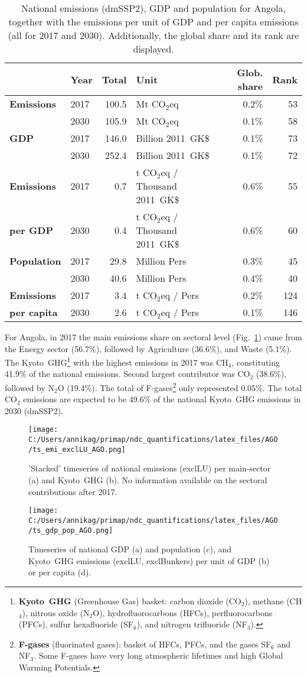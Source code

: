 \documentclass[12pt]{article}
\begin{document}
 \begin{table}[htbp]
 \centering
 \caption{National emissions (dmSSP2), GDP and population for Angola, together with the emissions per unit of GDP and per capita emissions (all for 2017 and 2030). 
 Additionally, the global share and its rank are displayed.}
 \label{tab:overview}
 \begin{tabular}{l || l r l r r}
 \bfseries  & \bfseries Year & \bfseries Total & \bfseries Unit & \bfseries Glob. share & \bfseries Rank \tabularnewline \hline \hline
 \bfseries Emissions & 2017 & 100.5 & Mt CO$_2$eq & 0.2\% & 53 \tabularnewline 
 \bfseries  & 2030 & 105.9 & Mt CO$_2$eq & 0.1\% & 58 \tabularnewline \hline
 \bfseries GDP & 2017 & 146.0 & Billion 2011~GK\$ & 0.1\% & 73 \tabularnewline 
 \bfseries  & 2030 & 252.4 & Billion 2011~GK\$ & 0.1\% & 72 \tabularnewline \hline
 \bfseries Emissions & 2017 & 0.7 & t CO$_2$eq / Thousand 2011~GK\$ & 0.6\% & 55 \tabularnewline 
 \bfseries per GDP & 2030 & 0.4 & t CO$_2$eq / Thousand 2011~GK\$ & 0.6\% & 60 \tabularnewline \hline
 \bfseries Population & 2017 & 29.8 & Million Pers & 0.3\% & 45 \tabularnewline 
 \bfseries  & 2030 & 40.6 & Million Pers & 0.4\% & 40 \tabularnewline \hline
 \bfseries Emissions & 2017 & 3.4 & t CO$_2$eq /  Pers & 0.2\% & 124 \tabularnewline 
 \bfseries per capita & 2030 & 2.6 & t CO$_2$eq /  Pers & 0.1\% & 146 \tabularnewline 
 \end{tabular}
 \end{table}

 For Angola, in 2017 the main emissions share on sectoral level (Fig.~\ref{fig:tsEmi}) came from the Energy sector (56.7\%), followed by Agriculture (36.6\%), and Waste (5.1\%). 
 The Kyoto~GHG\footnote{\textbf{Kyoto~GHG} (Greenhouse Gas) basket: carbon dioxide (CO$_2$), methane (CH$_4$), nitrous oxide (N$_2$O), hydrofluorocarbons (HFCs), perfluorocarbons (PFCs), sulfur hexafluoride (SF$_6$), and nitrogen trifluoride (NF$_3$).} with the highest emissions in 2017 was CH$_4$, constituting  41.9\% of the national emissions. 
 Second largest contributor was CO$_2$ (38.6\%), followed by N$_2$O (19.4\%). 
 The total of F-gases\footnote{\textbf{F-gases} (fluorinated gases): basket of HFCs, PFCs, and the gases SF$_6$ and NF$_3$. 
 Some F-gases have very long atmospheric lifetimes and high Global Warming Potentials.} only represented 0.05\%.
 The total CO$_2$ emissions are expected to be 49.6\% of the national Kyoto~GHG emissions in 2030 (dmSSP2).
 \begin{figure}[htbp]
 \centering
 \texttt{[image: C:/Users/annikag/primap/ndc\_quantifications/latex\_files/AGO/ts\_emi\_exclLU\_AGO.png]}
 \caption{'Stacked' timeseries of national emissions (exclLU) per main-sector (a) and Kyoto~GHG (b). 
 No information available on the sectoral contributions after 2017.}
 \label{fig:tsEmi}
 \end{figure}
 \begin{figure}[htbp]
 \centering
 \texttt{[image: C:/Users/annikag/primap/ndc\_quantifications/latex\_files/AGO/ts\_gdp\_pop\_AGO.png]}
 \caption{Timeseries of national GDP (a) and population (c), and Kyoto~GHG emissions (exclLU, exclBunkers) per unit of GDP (b) or per capita (d).}
 \label{fig:tsSocioEco}
 \end{figure}
\end{document}
